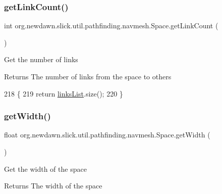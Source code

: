 \subsubsection{\texorpdfstring{get\+Link\+Count()}{getLinkCount()}}
{\footnotesize\ttfamily int org.\+newdawn.\+slick.\+util.\+pathfinding.\+navmesh.\+Space.\+get\+Link\+Count (\begin{DoxyParamCaption}{ }\end{DoxyParamCaption})\hspace{0.3cm}{\ttfamily [inline]}}

Get the number of links

\begin{DoxyReturn}{Returns}
The number of links from the space to others 
\end{DoxyReturn}

\begin{DoxyCode}
218                               \{
219         \textcolor{keywordflow}{return} \mbox{\hyperlink{classorg_1_1newdawn_1_1slick_1_1util_1_1pathfinding_1_1navmesh_1_1_space_ab8ed6f02eb154ea33c907a3dda0b92db}{linksList}}.size();
220     \}
\end{DoxyCode}
\mbox{\label{classorg_1_1newdawn_1_1slick_1_1util_1_1pathfinding_1_1navmesh_1_1_space_a1558455284621167498ce4afb1374f63}} 
\subsubsection{\texorpdfstring{get\+Width()}{getWidth()}}
{\footnotesize\ttfamily float org.\+newdawn.\+slick.\+util.\+pathfinding.\+navmesh.\+Space.\+get\+Width (\begin{DoxyParamCaption}{ }\end{DoxyParamCaption})\hspace{0.3cm}{\ttfamily [inline]}}

Get the width of the space

\begin{DoxyReturn}{Returns}
The width of the space 
\end{DoxyReturn}


